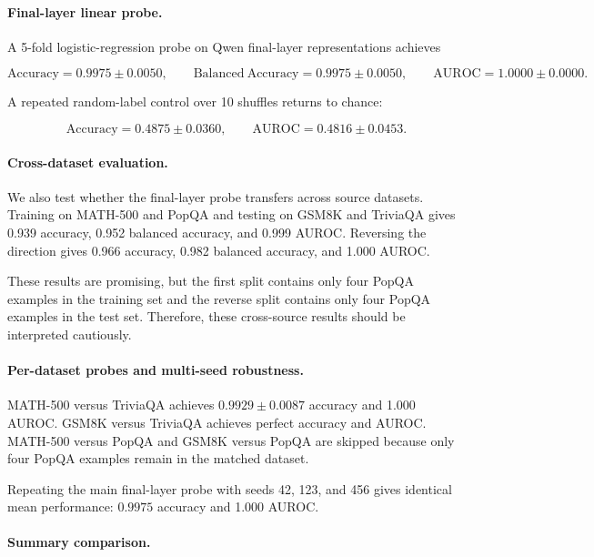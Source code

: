 \documentclass[11pt]{article}
\begin{document}
\paragraph{Final-layer linear probe.}

A 5-fold logistic-regression probe on Qwen final-layer representations
achieves

\[
\mathrm{Accuracy}=0.9975 \pm 0.0050,
\qquad
\mathrm{Balanced\ Accuracy}=0.9975 \pm 0.0050,
\qquad
\mathrm{AUROC}=1.0000 \pm 0.0000.
\]

A repeated random-label control over 10 shuffles returns to chance:

\[
\mathrm{Accuracy}=0.4875 \pm 0.0360,
\qquad
\mathrm{AUROC}=0.4816 \pm 0.0453.
\]

\paragraph{Cross-dataset evaluation.}

We also test whether the final-layer probe transfers across source
datasets. Training on MATH-500 and PopQA and testing on GSM8K and
TriviaQA gives 0.939 accuracy, 0.952 balanced accuracy, and 0.999
AUROC. Reversing the direction gives 0.966 accuracy, 0.982 balanced
accuracy, and 1.000 AUROC.

These results are promising, but the first split contains only four
PopQA examples in the training set and the reverse split contains only
four PopQA examples in the test set. Therefore, these cross-source
results should be interpreted cautiously.

\paragraph{Per-dataset probes and multi-seed robustness.}

MATH-500 versus TriviaQA achieves \(0.9929 \pm 0.0087\) accuracy and
1.000 AUROC. GSM8K versus TriviaQA achieves perfect accuracy and AUROC.
MATH-500 versus PopQA and GSM8K versus PopQA are skipped because only
four PopQA examples remain in the matched dataset.

Repeating the main final-layer probe with seeds 42, 123, and 456 gives
identical mean performance: \(0.9975\) accuracy and 1.000 AUROC.

\paragraph{Summary comparison.}
\end{document}
